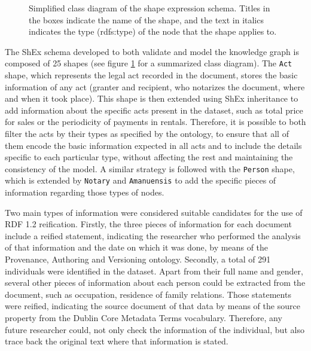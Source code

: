 \documentclass{article}
\begin{document}
\begin{figure}
    \centering
    
    \caption{Simplified class diagram of the shape expression schema. Titles in the boxes indicate the name of the shape, and the text in italics indicates the type (rdfs:type) of the node that the shape applies to.}
    \label{somier}
\end{figure}

The ShEx schema developed to both validate and model the knowledge graph is composed of 25 shapes (see figure \ref{somier} for a summarized class diagram).
The \texttt{Act} shape, which represents the legal act recorded in the document, stores the basic information of any act (granter and recipient, who notarizes the document, where and when it took place).
This shape is then extended using ShEx inheritance to add information about the specific acts present in the dataset, such as total price for sales or the periodicity of payments in rentals.
Therefore, it is possible to both filter the acts by their types as specified by the ontology, to ensure that all of them encode the basic information expected in all acts and to include the details specific to each particular type, without affecting the rest and maintaining the consistency of the model.
A similar strategy is followed with the \texttt{Person} shape, which is extended by \texttt{Notary} and \texttt{Amanuensis} to add the specific pieces of information regarding those types of nodes.

Two main types of information were considered suitable candidates for the use of RDF 1.2 reification.
Firstly, the three pieces of information for each document include a reified statement, indicating the researcher who performed the analysis of that information and the date on which it was done, by means of the Provenance, Authoring and Versioning ontology\cite{ciccarese_pav_2013}.
Secondly, a total of 291 individuals were identified in the dataset.
Apart from their full name and gender, several other pieces of information about each person could be extracted from the document, such as occupation, residence of family relations.
Those statements were reified, indicating the source document of that data by means of the source property from the Dublin Core Metadata Terms vocabulary.
Therefore, any future researcher could, not only check the information of the individual, but also trace back the original text where that information is stated.
\end{document}
